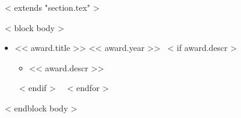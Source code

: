 ~< extends "section.tex" >~

~< block body >~
\begin{itemize}
  ~< for award in items >~
    \item << award.title >> \hfill << award.year >>
    ~< if award.descr >~
      \begin{itemize}
      \item << award.descr >>
      \end{itemize}
    ~< endif >~
  ~< endfor >~
\end{itemize}
~< endblock body >~
